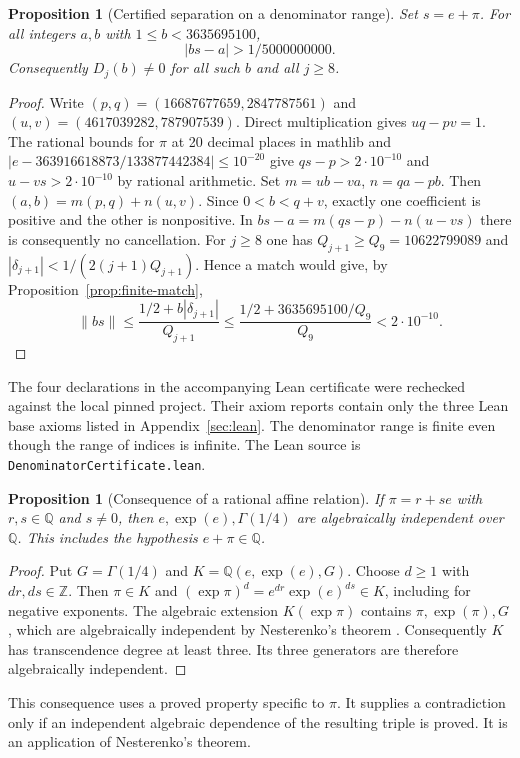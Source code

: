 \documentclass[11pt]{amsart}
\newtheorem{proposition}[theorem]{Proposition}
\theoremstyle{definition}
\theoremstyle{remark}
\numberwithin{equation}{section}
\newcommand{\Q}{\mathbb{Q}}
\newcommand{\Z}{\mathbb{Z}}
\begin{document}
\begin{proposition}[Certified separation on a denominator range]\label{prop:farey-gap}
Set $s=e+\pi$. For all integers $a,b$ with $1\le b<3635695100$,
\[
  |bs-a|>1/5000000000 .
\]
Consequently $D_j(b)\ne0$ for all such $b$ and all $j\ge8$.
\end{proposition}
\begin{proof}
Write $(p,q)=(16687677659,2847787561)$ and
$(u,v)=(4617039282,787907539)$. Direct multiplication gives $uq-pv=1$.
The rational bounds for $\pi$ at 20 decimal places in mathlib and
$|e-363916618873/133877442384|\le10^{-20}$ give
$q s-p>2\cdot10^{-10}$ and $u-vs>2\cdot10^{-10}$ by rational arithmetic.
Set $m=ub-va$, $n=qa-pb$. Then $(a,b)=m(p,q)+n(u,v)$.
Since $0<b<q+v$, exactly one coefficient is positive and the other is
nonpositive. In $bs-a=m(qs-p)-n(u-vs)$ there is consequently no
cancellation. For $j\ge8$ one has $Q_{j+1}\ge Q_9=10622799089$ and
$|\delta_{j+1}|<1/(2(j+1)Q_{j+1})$. Hence a match would give, by
Proposition~\ref{prop:finite-match},
\[
 \|bs\|\le\frac{1/2+b|\delta_{j+1}|}{Q_{j+1}}
 \le\frac{1/2+3635695100/Q_9}{Q_9}<2\cdot10^{-10}.
\]
\end{proof}
The four declarations in the accompanying Lean certificate were rechecked against the local pinned project. Their axiom reports contain only the three Lean base axioms listed in Appendix~\ref{sec:lean}. The denominator range is finite even though the range of indices is
infinite. The Lean source is \texttt{DenominatorCertificate.lean}.

\begin{proposition}[Consequence of a rational affine relation]\label{prop:nest-transfer}
If $\pi=r+se$ with $r,s\in\Q$ and $s\ne0$, then
$e,\exp(e),\Gamma(1/4)$ are algebraically independent over $\Q$.
This includes the hypothesis $e+\pi\in\Q$.
\end{proposition}
\begin{proof}
Put $G=\Gamma(1/4)$ and $K=\Q(e,\exp(e),G)$. Choose $d\ge1$ with
$dr,ds\in\Z$. Then $\pi\in K$ and
$(\exp\pi)^d=e^{dr}\exp(e)^{ds}\in K$, including for negative exponents.
The algebraic extension $K(\exp\pi)$ contains
$\pi,\exp(\pi),G$, which are algebraically independent by
Nesterenko's theorem \cite{Nesterenko1996}. Consequently $K$ has
transcendence degree at least three. Its three generators are therefore
algebraically independent.
\end{proof}
This consequence uses a proved property specific to $\pi$. It supplies a
contradiction only if an independent algebraic dependence of the resulting
triple is proved. It is an application of Nesterenko's theorem.
\end{document}
